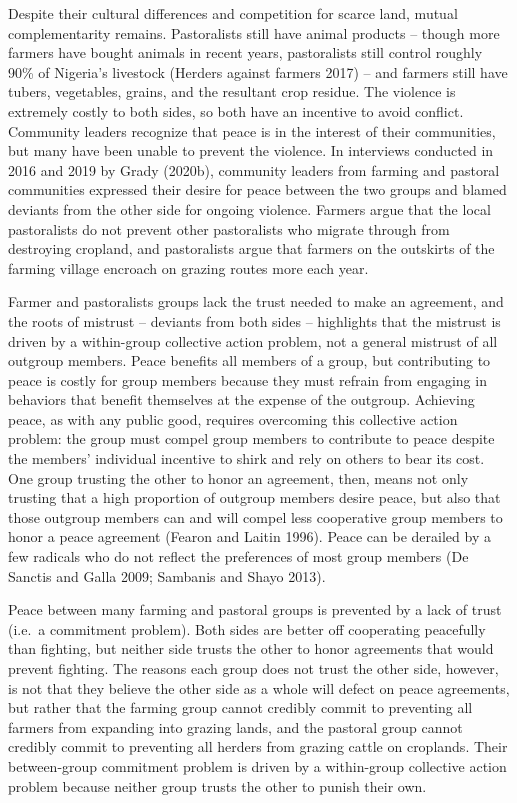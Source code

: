 \documentclass[11pt]{article}
\begin{document}
Despite their cultural differences and competition for scarce land,
mutual complementarity remains. Pastoralists still have animal products
-- though more farmers have bought animals in recent years, pastoralists
still control roughly 90\% of Nigeria's livestock (Herders against
farmers 2017) -- and farmers still have tubers, vegetables, grains, and
the resultant crop residue. The violence is extremely costly to both
sides, so both have an incentive to avoid conflict. Community leaders
recognize that peace is in the interest of their communities, but many
have been unable to prevent the violence. In interviews conducted in
2016 and 2019 by Grady (2020b), community leaders from farming and
pastoral communities expressed their desire for peace between the two
groups and blamed deviants from the other side for ongoing violence.
Farmers argue that the local pastoralists do not prevent other
pastoralists who migrate through from destroying cropland, and
pastoralists argue that farmers on the outskirts of the farming village
encroach on grazing routes more each year.

Farmer and pastoralists groups lack the trust needed to make an
agreement, and the roots of mistrust -- deviants from both sides --
highlights that the mistrust is driven by a within-group collective
action problem, not a general mistrust of all outgroup members. Peace
benefits all members of a group, but contributing to peace is costly for
group members because they must refrain from engaging in behaviors that
benefit themselves at the expense of the outgroup. Achieving peace, as
with any public good, requires overcoming this collective action
problem: the group must compel group members to contribute to peace
despite the members' individual incentive to shirk and rely on others to
bear its cost. One group trusting the other to honor an agreement, then,
means not only trusting that a high proportion of outgroup members
desire peace, but also that those outgroup members can and will compel
less cooperative group members to honor a peace agreement (Fearon and
Laitin 1996). Peace can be derailed by a few radicals who do not reflect
the preferences of most group members (De Sanctis and Galla 2009;
Sambanis and Shayo 2013).

Peace between many farming and pastoral groups is prevented by a lack of
trust (i.e.~a commitment problem). Both sides are better off cooperating
peacefully than fighting, but neither side trusts the other to honor
agreements that would prevent fighting. The reasons each group does not
trust the other side, however, is not that they believe the other side
as a whole will defect on peace agreements, but rather that the farming
group cannot credibly commit to preventing all farmers from expanding
into grazing lands, and the pastoral group cannot credibly commit to
preventing all herders from grazing cattle on croplands. Their
between-group commitment problem is driven by a within-group collective
action problem because neither group trusts the other to punish their
own.
\end{document}
